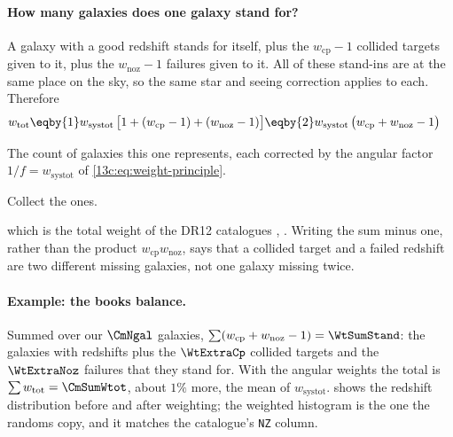 \paragraph{How many galaxies does one galaxy stand for?}
A galaxy with a good redshift stands for itself, plus the $w_{\mathrm{cp}}-1$
collided targets given to it, plus the $w_{\mathrm{noz}}-1$ failures given to it.
All of these stand-ins are at the same place on the sky, so the same star and seeing
correction applies to each. Therefore
\begin{align}
  w_{\mathrm{tot}}
  &\eqby{1}w_{\mathrm{systot}}\,\bigl[1+(w_{\mathrm{cp}}-1)+(w_{\mathrm{noz}}-1)\bigr]
  \eqby{2}w_{\mathrm{systot}}\,\bigl(w_{\mathrm{cp}}+w_{\mathrm{noz}}-1\bigr)
  \label{13c:eq:wtot}
\end{align}
\begin{explain}
  \item The count of galaxies this one represents, each corrected by the angular
        factor $1/f=w_{\mathrm{systot}}$ of \eqref{13c:eq:weight-principle}.
  \item Collect the ones.
\end{explain}
which is the total weight of the DR12 catalogues ,
. Writing the sum minus one, rather than the product
$w_{\mathrm{cp}}w_{\mathrm{noz}}$, says that a collided target and a failed
redshift are two different missing galaxies, not one galaxy missing twice.

\paragraph{Example: the books balance.}
Summed over our $\CmNgal$ galaxies, $\sum(w_{\mathrm{cp}}+w_{\mathrm{noz}}-1)=\WtSumStand$:
the galaxies with redshifts plus the $\WtExtraCp$ collided targets and the
$\WtExtraNoz$ failures that they stand for. With the angular weights the total is
$\sum w_{\mathrm{tot}}=\CmSumWtot$, about $1\%$ more, the mean of $w_{\mathrm{systot}}$.
 shows the redshift distribution before and after weighting; the
weighted histogram is the one the randoms copy, and it matches the catalogue's
\texttt{NZ} column.

